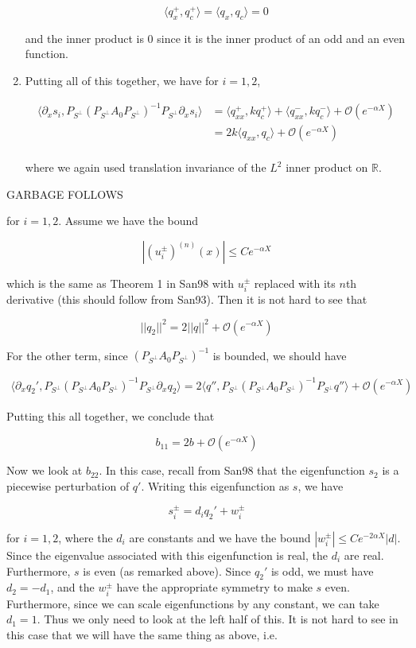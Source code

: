 \documentclass[12pt]{article}
\def\R{{\mathbb R}}
\begin{document}
\begin{enumerate}
\[
\langle q^+_x, q^+_c \rangle = \langle q_x, q_c \rangle = 0
\]

and the inner product is 0 since it is the inner product of an odd and an even function.

\item Putting all of this together, we have for $i = 1, 2$,

\begin{align*}
\langle \partial_x s_i, P_{S^\perp} (P_{S^\perp} A_0 P_{S^\perp})^{-1} P_{S^\perp} \partial_x s_i \rangle
&= \langle q^+_{xx}, k q^+_c \rangle + 
\langle q^-_{xx}, k q^-_c \rangle 
+ \mathcal{O}(e^{-\alpha X}) \\
&= 2 k \langle q_{xx}, q_c \rangle 
+ \mathcal{O}(e^{-\alpha X}) \\
\end{align*}

where we again used translation invariance of the $L^2$ inner product on $\R$.

\end{enumerate}

GARBAGE FOLLOWS

for $i = 1, 2$. Assume we have the bound

\[
|(u_i^\pm)^{(n)}(x)| \leq C e^{-\alpha X}
\] 

which is the same as Theorem 1 in San98 with $u_i^\pm$ replaced with its $n$th derivative (this should follow from San93). Then it is not hard to see that 

\[
||q_2||^2 = 2 ||q||^2 + \mathcal{O}(e^{-\alpha X})
\]

For the other term, since $(P_{S^\perp} A_0 P_{S^\perp})^{-1}$ is bounded, we should have

\begin{align*}
\langle \partial_x q_2', P_{S^\perp} (P_{S^\perp} A_0 P_{S^\perp})^{-1} P_{S^\perp} \partial_x q_2 \rangle 
= 2 \langle q'', P_{S^\perp} (P_{S^\perp} A_0 P_{S^\perp})^{-1} P_{S^\perp} q'' \rangle + \mathcal{O}(e^{-\alpha X})
\end{align*}

Putting this all together, we conclude that 

\[
b_{11} = 2b + \mathcal{O}(e^{-\alpha X})
\]

Now we look at $b_{22}$. In this case, recall from San98 that the eigenfunction $s_2$ is a piecewise perturbation of $q'$. Writing this eigenfunction as $s$, we have

\[
s_i^\pm = d_i q_2' + w_i^\pm
\]

for $i = 1, 2$, where the $d_i$ are constants and we have the bound $|w_i^\pm| \leq C e^{-2 \alpha X}|d|$. Since the eigenvalue associated with this eigenfunction is real, the $d_i$ are real. Furthermore, $s$ is even (as remarked above). Since $q_2'$ is odd, we must have $d_2 = -d_1$, and the $w_i^\pm$ have the appropriate symmetry to make $s$ even. Furthermore, since we can scale eigenfunctions by any constant, we can take $d_1 = 1$. Thus we only need to look at the left half of this. It is not hard to see in this case that we will have the same thing as above, i.e. 
\end{document}
